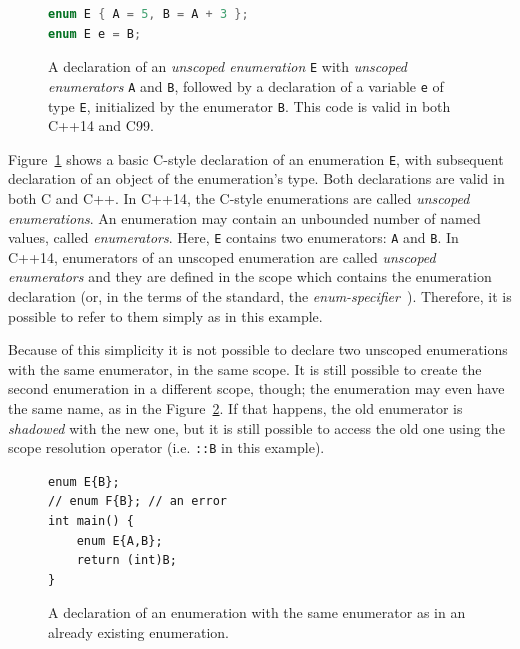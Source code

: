 \documentclass{fithesis3}
\newcommand{\theStandard}[1]{\cite[\S 7.2:2]{n4296}\xspace}
\begin{document}
\begin{figure}
\begin{lstlisting}[language=C++]
enum E { A = 5, B = A + 3 };
enum E e = B;
\end{lstlisting}
\caption{A declaration of an \textit{unscoped enumeration} \texttt{E} with \textit{unscoped enumerators} \texttt{A} and \texttt{B}, followed by a declaration of a variable \texttt{e} of type \texttt{E}, initialized by the enumerator \texttt{B}. This code is valid in both C++14 and C99.}
\label{CStyleEnumDeclaration}
\end{figure}

Figure~\ref{CStyleEnumDeclaration} shows a basic C-style declaration of an enumeration \texttt{E}, with subsequent declaration of an object of the enumeration's type. Both declarations are valid in both C and C++. In C++14, the C-style enumerations are called \textit{unscoped enumerations}. An enumeration may contain an unbounded number of named values, called \textit{enumerators}. Here, \texttt{E} contains two enumerators: \texttt{A} and \texttt{B}. In C++14, enumerators of an unscoped enumeration are called \textit{unscoped enumerators} and they are defined in the scope which contains the enumeration declaration (or, in the terms of the standard, the \textit{enum-specifier}~\theStandard{7.2:11}). Therefore, it is possible to refer to them simply as in this example.

Because of this simplicity it is not possible to declare two unscoped enumerations with the same enumerator, in the same scope. It is still possible to create the second enumeration in a different scope, though; the enumeration may even have the same name, as in the Figure~\ref{fig:collidingEnumerators}. If that happens, the old enumerator is \textit{shadowed} with the new one, but it is still possible to access the old one using the scope resolution operator (i.e. \texttt{::B} in this example).
\begin{figure}
\begin{lstlisting}
enum E{B};
// enum F{B}; // an error
int main() { 
    enum E{A,B};
    return (int)B;
}  
\end{lstlisting}
\caption{A declaration of an enumeration with the same enumerator as in an already existing enumeration.}
\label{fig:collidingEnumerators}
\end{figure}


\end{document}
